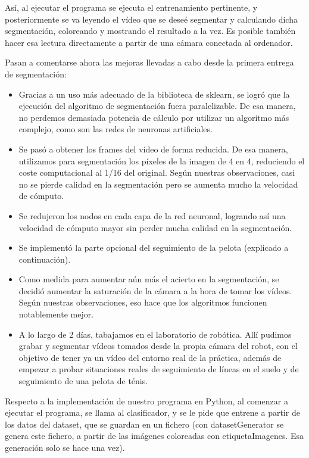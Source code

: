 \documentclass{article}
\begin{document}
	Así, al ejecutar el programa se ejecuta el entrenamiento pertinente, y posteriormente se va leyendo el vídeo que se deseé segmentar y calculando dicha segmentación, coloreando y mostrando el resultado a la vez. Es posible también hacer esa lectura directamente a partir de una cámara conectada al ordenador.

	Pasan a comentarse ahora las mejoras llevadas a cabo desde la primera entrega de segmentación:

	\begin{itemize}
		\item Gracias a un uso más adecuado de la biblioteca de sklearn, se logró que la ejecución del algoritmo de segmentación fuera paralelizable. De esa manera, no perdemos demasiada potencia de cálculo por utilizar un algoritmo más complejo, como son las redes de neuronas artificiales.
		\item Se pasó a obtener los frames del vídeo de forma reducida. De esa manera, utilizamos para segmentación los píxeles de la imagen de 4 en 4, reduciendo el coste computacional al 1/16 del original. Según nuestras observaciones, casi no se pierde calidad en la segmentación pero se aumenta mucho la velocidad de cómputo.
		\item Se redujeron los nodos en cada capa de la red neuronal, logrando así una velocidad de cómputo mayor sin perder mucha calidad en la segmentación.
		\item Se implementó la parte opcional del seguimiento de la pelota (explicado a continuación).
		\item Como medida para aumentar aún más el acierto en la segmentación, se decidió aumentar la saturación de la cámara a la hora de tomar los vídeos. Según nuestras observaciones, eso hace que los algoritmos funcionen notablemente mejor.
		\item A lo largo de 2 días, tabajamos en el laboratorio de robótica. Allí pudimos grabar y segmentar vídeos tomados desde la propia cámara del robot, con el objetivo de tener ya un vídeo del entorno real de la práctica, además de empezar a probar situaciones reales de seguimiento de líneas en el suelo y de seguimiento de una pelota de ténis.
	\end{itemize}

	Respecto a la implementación de nuestro programa en Python, al comenzar a ejecutar el programa, se llama al clasificador, y se le pide que entrene a partir de los datos del dataset, que se guardan en un fichero (con datasetGenerator se genera este fichero, a partir de las imágenes coloreadas con etiquetaImagenes. Esa generación solo se hace una vez). 
\end{document}

